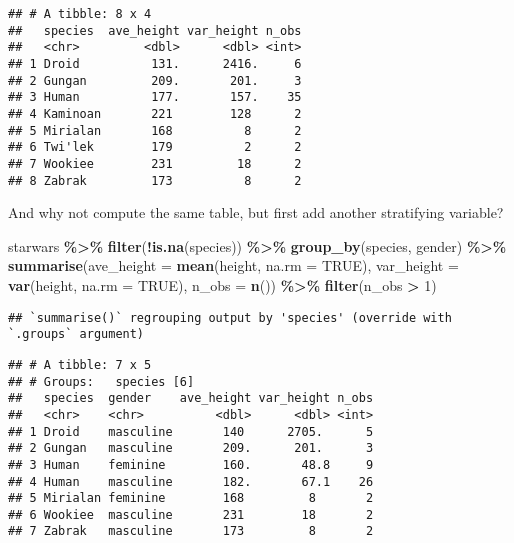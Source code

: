 \documentclass[
]{article}
\newenvironment{Shaded}{\begin{snugshade}}{\end{snugshade}}
\newcommand{\DataTypeTok}[1]{\textcolor[rgb]{0.13,0.29,0.53}{#1}}
\newcommand{\DecValTok}[1]{\textcolor[rgb]{0.00,0.00,0.81}{#1}}
\newcommand{\KeywordTok}[1]{\textcolor[rgb]{0.13,0.29,0.53}{\textbf{#1}}}
\newcommand{\NormalTok}[1]{#1}
\newcommand{\OperatorTok}[1]{\textcolor[rgb]{0.81,0.36,0.00}{\textbf{#1}}}
\newcommand{\OtherTok}[1]{\textcolor[rgb]{0.56,0.35,0.01}{#1}}
\newcommand{\StringTok}[1]{\textcolor[rgb]{0.31,0.60,0.02}{#1}}
\begin{document}
\begin{verbatim}
## # A tibble: 8 x 4
##   species  ave_height var_height n_obs
##   <chr>         <dbl>      <dbl> <int>
## 1 Droid          131.      2416.     6
## 2 Gungan         209.       201.     3
## 3 Human          177.       157.    35
## 4 Kaminoan       221        128      2
## 5 Mirialan       168          8      2
## 6 Twi'lek        179          2      2
## 7 Wookiee        231         18      2
## 8 Zabrak         173          8      2
\end{verbatim}

And why not compute the same table, but first add another stratifying variable?

\begin{Shaded}
\begin{Highlighting}[]
\NormalTok{starwars }\OperatorTok{\%\textgreater{}\%}
\StringTok{  }\KeywordTok{filter}\NormalTok{(}\OperatorTok{!}\KeywordTok{is.na}\NormalTok{(species)) }\OperatorTok{\%\textgreater{}\%}
\StringTok{  }\KeywordTok{group\_by}\NormalTok{(species, gender) }\OperatorTok{\%\textgreater{}\%}
\StringTok{  }\KeywordTok{summarise}\NormalTok{(}\DataTypeTok{ave\_height =} \KeywordTok{mean}\NormalTok{(height, }\DataTypeTok{na.rm =} \OtherTok{TRUE}\NormalTok{), }\DataTypeTok{var\_height =} \KeywordTok{var}\NormalTok{(height, }\DataTypeTok{na.rm =} \OtherTok{TRUE}\NormalTok{), }\DataTypeTok{n\_obs =} \KeywordTok{n}\NormalTok{()) }\OperatorTok{\%\textgreater{}\%}
\StringTok{  }\KeywordTok{filter}\NormalTok{(n\_obs }\OperatorTok{\textgreater{}}\StringTok{ }\DecValTok{1}\NormalTok{)}
\end{Highlighting}
\end{Shaded}

\begin{verbatim}
## `summarise()` regrouping output by 'species' (override with `.groups` argument)
\end{verbatim}

\begin{verbatim}
## # A tibble: 7 x 5
## # Groups:   species [6]
##   species  gender    ave_height var_height n_obs
##   <chr>    <chr>          <dbl>      <dbl> <int>
## 1 Droid    masculine       140      2705.      5
## 2 Gungan   masculine       209.      201.      3
## 3 Human    feminine        160.       48.8     9
## 4 Human    masculine       182.       67.1    26
## 5 Mirialan feminine        168         8       2
## 6 Wookiee  masculine       231        18       2
## 7 Zabrak   masculine       173         8       2
\end{verbatim}
\end{document}
